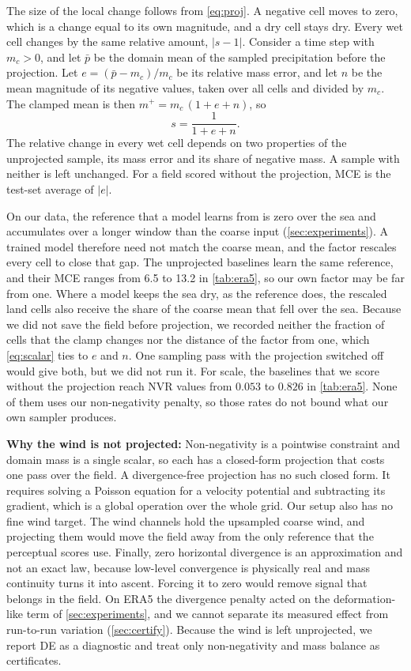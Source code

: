 \documentclass[sigconf,nonacm]{acmart}
\begin{document}
The size of the local change follows from \cref{eq:proj}. A negative cell moves to zero, which is a change equal to its own magnitude, and a dry cell stays dry. Every wet cell changes by the same relative amount, $|s-1|$. Consider a time step with $m_c > 0$, and let $\bar p$ be the domain mean of the sampled precipitation before the projection. Let $e = (\bar p - m_c)/m_c$ be its relative mass error, and let $n$ be the mean magnitude of its negative values, taken over all cells and divided by $m_c$. The clamped mean is then $m^{+} = m_c\,(1 + e + n)$, so
\begin{equation}
s = \frac{1}{1 + e + n}.
\label{eq:scalar}
\end{equation}
The relative change in every wet cell depends on two properties of the unprojected sample, its mass error and its share of negative mass. A sample with neither is left unchanged. For a field scored without the projection, MCE is the test-set average of $|e|$.

On our data, the reference that a model learns from is zero over the sea and accumulates over a longer window than the coarse input (\cref{sec:experiments}). A trained model therefore need not match the coarse mean, and the factor rescales every cell to close that gap. The unprojected baselines learn the same reference, and their MCE ranges from 6.5 to 13.2 in \cref{tab:era5}, so our own factor may be far from one. Where a model keeps the sea dry, as the reference does, the rescaled land cells also receive the share of the coarse mean that fell over the sea. Because we did not save the field before projection, we recorded neither the fraction of cells that the clamp changes nor the distance of the factor from one, which \cref{eq:scalar} ties to $e$ and $n$. One sampling pass with the projection switched off would give both, but we did not run it. For scale, the baselines that we score without the projection reach NVR values from $0.053$ to $0.826$ in \cref{tab:era5}. None of them uses our non-negativity penalty, so those rates do not bound what our own sampler produces.

\textbf{Why the wind is not projected:} Non-negativity is a pointwise constraint and domain mass is a single scalar, so each has a closed-form projection that costs one pass over the field. A divergence-free projection has no such closed form. It requires solving a Poisson equation for a velocity potential and subtracting its gradient, which is a global operation over the whole grid. Our setup also has no fine wind target. The wind channels hold the upsampled coarse wind, and projecting them would move the field away from the only reference that the perceptual scores use. Finally, zero horizontal divergence is an approximation and not an exact law, because low-level convergence is physically real and mass continuity turns it into ascent. Forcing it to zero would remove signal that belongs in the field. On ERA5 the divergence penalty acted on the deformation-like term of \cref{sec:experiments}, and we cannot separate its measured effect from run-to-run variation (\cref{sec:certify}). Because the wind is left unprojected, we report DE as a diagnostic and treat only non-negativity and mass balance as certificates.
\end{document}

